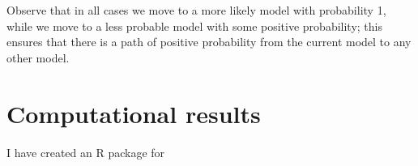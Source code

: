 \documentclass[12pt]{article}
\begin{document}
Observe that in all cases we move to a more likely model with
probability 1, while we move to a less probable model with some
positive probability; this ensures that there is a path of positive
probability from the current model to any other model.

\section{Computational results}

I have created an R package for 



\end{document}
